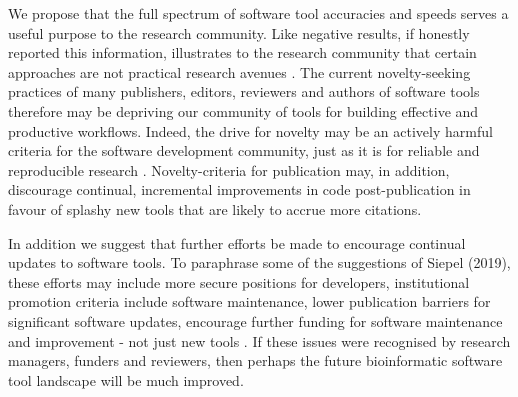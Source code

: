 \documentclass{bmcart}
\begin{document}


We propose that the full spectrum of software tool accuracies and
speeds serves a useful purpose to the research community. Like
negative results, if honestly reported this information, illustrates
to the research community that certain approaches are not practical
research avenues
\cite{fanelli2012negative}. %
The current novelty-seeking practices of many publishers, editors,
reviewers and authors of software tools therefore may be depriving our
community of tools for building effective and productive workflows.
{\color{red} Indeed, the drive for novelty may be an actively harmful
  criteria for the software development community, just as it is for reliable
  and reproducible research
  \cite{brembs2019reliable}. Novelty-criteria for publication may, in
  addition, discourage continual, incremental improvements in code
  post-publication in favour of splashy new tools that are likely to
  accrue more citations. }

{\color{red} In addition we suggest that further efforts be made to
  encourage continual updates to software tools. To paraphrase some of
  the suggestions of Siepel (2019), these efforts may include more
  secure positions for developers, institutional promotion criteria
  include software maintenance, lower publication barriers for
  significant software updates, encourage further funding for software
  maintenance and improvement - not just new tools
  \cite{siepel2019challenges}. If these issues were recognised by
  research managers, funders and reviewers, then perhaps
  the future bioinformatic software tool landscape will be much improved. }
\end{document}
